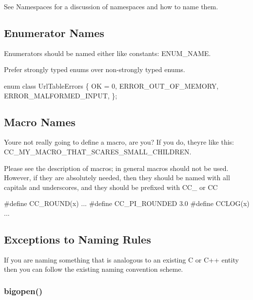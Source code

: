 See Namespaces for a discussion of namespaces and how to name them.

\subsection*{Enumerator Names}

Enumerators should be named either like constants\+: {\ttfamily E\+N\+U\+M\+\_\+\+N\+A\+ME}.

Prefer strongly typed enums over non-\/strongly typed enums.


\begin{DoxyCode}
\textcolor{keyword}{enum class} UrlTableErrors \{
  OK = 0,
  ERROR\_OUT\_OF\_MEMORY,
  ERROR\_MALFORMED\_INPUT,
\};
\end{DoxyCode}


\subsection*{Macro Names}

You\textquotesingle{}re not really going to define a macro, are you? If you do, they\textquotesingle{}re like this\+: C\+C\+\_\+\+M\+Y\+\_\+\+M\+A\+C\+R\+O\+\_\+\+T\+H\+A\+T\+\_\+\+S\+C\+A\+R\+E\+S\+\_\+\+S\+M\+A\+L\+L\+\_\+\+C\+H\+I\+L\+D\+R\+EN.

Please see the description of macros; in general macros should not be used. However, if they are absolutely needed, then they should be named with all capitals and underscores, and they should be prefixed with {\ttfamily C\+C\+\_\+} or {\ttfamily CC}


\begin{DoxyCode}
\textcolor{preprocessor}{#define CC\_ROUND(x) ...}
\textcolor{preprocessor}{#define CC\_PI\_ROUNDED 3.0}
\textcolor{preprocessor}{#define CCLOG(x) ...}
\end{DoxyCode}


\subsection*{Exceptions to Naming Rules}

If you are naming something that is analogous to an existing C or C++ entity then you can follow the existing naming convention scheme.

\subsubsection*{{\ttfamily bigopen()}}

